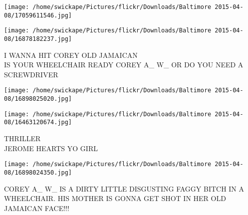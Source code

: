 \documentclass[10pt,letterpaper]{article}
\begin{document}
\texttt{[image: /home/swickape/Pictures/flickr/Downloads/Baltimore 2015-04-08/17059611546.jpg]}

\vspace{0.25in}
\texttt{[image: /home/swickape/Pictures/flickr/Downloads/Baltimore 2015-04-08/16878182237.jpg]}

I WANNA HIT COREY OLD JAMAICAN\\
IS YOUR WHEELCHAIR READY COREY A\_ W\_ OR DO YOU NEED A SCREWDRIVER\\
\pagebreak

\texttt{[image: /home/swickape/Pictures/flickr/Downloads/Baltimore 2015-04-08/16898025020.jpg]}

\vspace{0.25in}
\texttt{[image: /home/swickape/Pictures/flickr/Downloads/Baltimore 2015-04-08/16463120674.jpg]}

THRILLER\\
JEROME HEARTS YO GIRL\\
\pagebreak

\texttt{[image: /home/swickape/Pictures/flickr/Downloads/Baltimore 2015-04-08/16898024350.jpg]}

COREY A\_ W\_ IS A DIRTY LITTLE DISGUSTING FAGGY BITCH IN A WHEELCHAIR.  HIS MOTHER IS GONNA GET SHOT IN HER OLD JAMAICAN FACE!!!\\
\pagebreak
\end{document}
